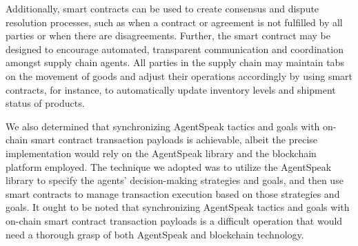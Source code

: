 Additionally, smart contracts can be used to create consensus and dispute resolution processes, such as when a contract or agreement is not fulfilled by all parties or when there are disagreements. Further, the smart contract may be designed to encourage automated, transparent communication and coordination amongst supply chain agents. All parties in the supply chain may maintain tabs on the movement of goods and adjust their operations accordingly by using smart contracts, for instance, to automatically update inventory levels and shipment status of products.

\vspace{.5cm}

We also determined that synchronizing AgentSpeak tactics and goals with on-chain smart contract transaction payloads is achievable, albeit the precise implementation would rely on the AgentSpeak library and the blockchain platform employed. The technique we adopted was to utilize the AgentSpeak library to specify the agents' decision-making strategies and goals, and then use smart contracts to manage transaction execution based on those strategies and goals. It ought to be noted that synchronizing AgentSpeak tactics and goals with on-chain smart contract transaction payloads is a difficult operation that would need a thorough grasp of both AgentSpeak and blockchain technology.
